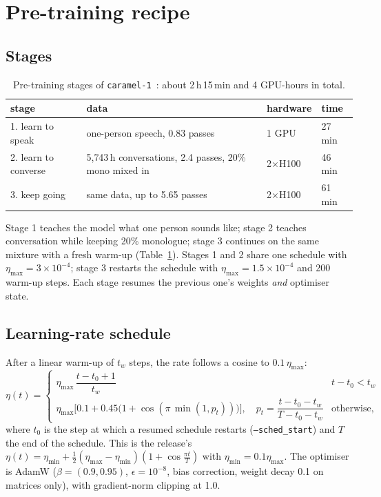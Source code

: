 \documentclass[10pt]{article}
\begin{document}
\section{Pre-training recipe}
\label{sec:pretrain}

\subsection{Stages}
\begin{table}[t]\centering\small
\begin{tabular}{llll}\toprule
stage & data & hardware & time\\\midrule
1. learn to speak & one-person speech, 0.83 passes & 1 GPU & 27 min\\
2. learn to converse & 5{,}743\,h conversations, 2.4 passes, 20\% mono mixed in & 2$\times$H100 & 46 min\\
3. keep going & same data, up to 5.65 passes & 2$\times$H100 & 61 min\\\bottomrule
\end{tabular}
\caption{Pre-training stages of \texttt{caramel-1}~\cite{caramel1}: about 2\,h\,15\,min and 4 GPU-hours in total.}
\label{tab:stages}
\end{table}
Stage 1 teaches the model what one person sounds like; stage 2 teaches conversation while keeping 20\% monologue; stage 3 continues on the same mixture with a fresh warm-up (Table~\ref{tab:stages}). Stages 1 and 2 share one schedule with $\eta_{\max}=3\times10^{-4}$; stage 3 restarts the schedule with $\eta_{\max}=1.5\times10^{-4}$ and 200 warm-up steps. Each stage resumes the previous one's weights \emph{and} optimiser state.

\subsection{Learning-rate schedule}
After a linear warm-up of $t_w$ steps, the rate follows a cosine to $0.1\,\eta_{\max}$:
\begin{equation}
\eta(t)=\begin{cases}\eta_{\max}\,\dfrac{t-t_0+1}{t_w} & t-t_0<t_w\\[6pt]
\eta_{\max}\Big[0.1+0.45\big(1+\cos(\pi\,\min(1,p_t))\big)\Big],\quad p_t=\dfrac{t-t_0-t_w}{T-t_0-t_w} & \text{otherwise,}\end{cases}
\label{eq:lr}
\end{equation}
where $t_0$ is the step at which a resumed schedule restarts (\texttt{--sched\_start}) and $T$ the end of the schedule. This is the release's $\eta(t)=\eta_{\min}+\frac12(\eta_{\max}-\eta_{\min})(1+\cos\frac{\pi t}{T})$ with $\eta_{\min}=0.1\eta_{\max}$. The optimiser is AdamW ($\beta=(0.9,0.95)$, $\epsilon=10^{-8}$, bias correction, weight decay 0.1 on matrices only), with gradient-norm clipping at 1.0.
\end{document}
